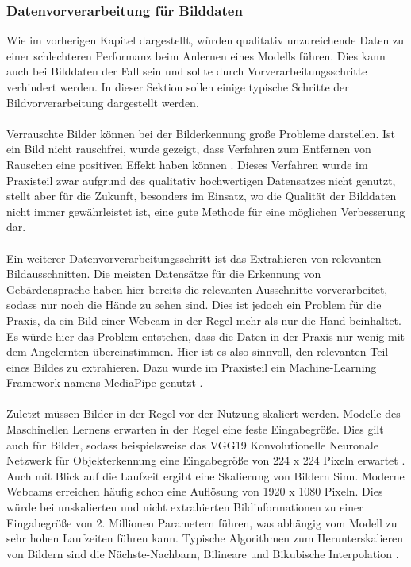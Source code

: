 \documentclass[11pt,bibliography=totocnumbered]{scrartcl}
\begin{document}
\subsubsection{Datenvorverarbeitung für Bilddaten}
Wie im vorherigen Kapitel dargestellt, würden qualitativ unzureichende Daten zu einer schlechteren Performanz beim Anlernen eines Modells führen. Dies kann auch bei Bilddaten der Fall sein und sollte durch Vorverarbeitungsschritte verhindert werden. In dieser Sektion sollen einige typische Schritte der Bildvorverarbeitung dargestellt werden.
\\\\
Verrauschte Bilder können bei der Bilderkennung große Probleme darstellen. Ist ein Bild nicht rauschfrei, wurde gezeigt, dass Verfahren zum Entfernen von Rauschen eine positiven Effekt haben können \cite{RAUSCH}. Dieses Verfahren wurde im Praxisteil zwar aufgrund des qualitativ hochwertigen Datensatzes nicht genutzt, stellt aber für die Zukunft, besonders im Einsatz, wo die Qualität der Bilddaten nicht immer gewährleistet ist, eine gute Methode für eine möglichen Verbesserung dar.
\\\\
Ein weiterer Datenvorverarbeitungsschritt ist das Extrahieren von relevanten Bildausschnitten. Die meisten Datensätze für die Erkennung von Gebärdensprache haben hier bereits die relevanten Ausschnitte vorverarbeitet, sodass nur noch die Hände zu sehen sind. Dies ist jedoch ein Problem für die Praxis, da ein Bild einer Webcam in der Regel mehr als nur die Hand beinhaltet. Es würde hier das Problem entstehen, dass die Daten in der Praxis nur wenig mit dem Angelernten übereinstimmen. Hier ist es also sinnvoll, den relevanten Teil eines Bildes zu extrahieren. Dazu wurde im Praxisteil ein Machine-Learning Framework namens MediaPipe genutzt \cite{MEDIAPIPE}.
\\\\
Zuletzt müssen Bilder in der Regel vor der Nutzung skaliert werden. Modelle des Maschinellen Lernens erwarten in der Regel eine feste Eingabegröße. Dies gilt auch für Bilder, sodass beispielsweise das VGG19 Konvolutionelle Neuronale Netzwerk für Objekterkennung eine Eingabegröße von 224 x 224 Pixeln erwartet \cite[S.2]{SCALE}. Auch mit Blick auf die Laufzeit ergibt eine Skalierung von Bildern Sinn. Moderne Webcams erreichen häufig schon eine Auflösung von 1920 x 1080 Pixeln. Dies würde bei unskalierten und nicht extrahierten Bildinformationen zu einer Eingabegröße von 2. Millionen Parametern führen, was abhängig vom Modell zu sehr hohen Laufzeiten führen kann. Typische Algorithmen zum Herunterskalieren von Bildern sind die Nächste-Nachbarn, Bilineare und Bikubische Interpolation \cite[S.2]{SCALE}.
\end{document}
